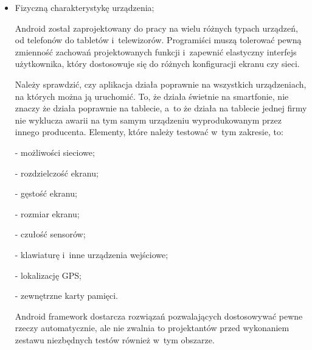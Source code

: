 \begin{itemize}
Według dokumentacji Android \cite{website:android:manual} możliwe są następujące opcje przechowywania danych:

- \textit{Shared Preferences}, czyli zachowywanie podstawowych danych w~parach klucz - wartość;

- pamięć wewnętrzna urządzenia - do zachowywania danych niepublicznych;

- zewnętrzna karta pamięci - do zachowywania danych publicznych;

- baza danych SQLite - do przechowywania danych w~prywatnej bazie danych;

- zasoby sieciowe - jako baza danych współdzielona pomiędzy urządzeniami.

Wszystkie te opcje korzystają ze wspólnego zestawu funkcji\footnote{Na przykład do obsługi plików używa się \textit{getFileDir(), getDir(), deleteFile()} itp.}, które tester powinien wziąć pod uwagę przy tworzeniu przypadków testowych.

\item{Fizyczną charakterystykę urządzenia;}

Android został zaprojektowany do pracy na wielu różnych typach urządzeń, od telefonów do tabletów i~telewizorów. Programiści muszą tolerować pewną zmienność zachowań projektowanych funkcji i~zapewnić elastyczny interfejs użytkownika, który dostosowuje się do różnych konfiguracji ekranu czy sieci.

Należy sprawdzić, czy aplikacja działa poprawnie na wszystkich urządzeniach, na których można ją uruchomić. To, że działa świetnie na smartfonie, nie znaczy że działa poprawnie na tablecie, a~to że działa na tablecie jednej firmy nie wyklucza awarii na tym samym urządzeniu wyprodukowanym przez innego producenta. Elementy, które należy testować w~tym zakresie, to:

- możliwości sieciowe;

- rozdzielczość ekranu;

- gęstość ekranu;

- rozmiar ekranu;

- czułość sensorów;

- klawiaturę i~inne urządzenia wejściowe;

- lokalizację GPS;

- zewnętrzne karty pamięci.

Android framework dostarcza rozwiązań pozwalających dostosowywać pewne rzeczy automatycznie, ale nie zwalnia to projektantów przed wykonaniem zestawu niezbędnych testów również w~tym obszarze.

\end{itemize}

